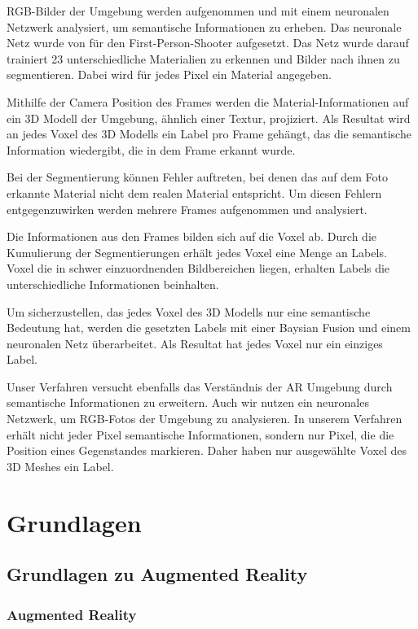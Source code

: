 RGB-Bilder der Umgebung werden aufgenommen und mit einem neuronalen Netzwerk analysiert, um semantische Informationen zu erheben. Das neuronale Netz wurde von \cite{contextawaremixedreality} für den First-Person-Shooter aufgesetzt. Das Netz wurde darauf trainiert 23 unterschiedliche Materialien zu erkennen und Bilder nach ihnen zu segmentieren. Dabei wird für jedes Pixel ein Material angegeben.

Mithilfe der Camera Position des Frames werden die Material-Informationen auf ein 3D Modell der Umgebung, ähnlich einer Textur, projiziert. Als Resultat wird an jedes Voxel des 3D Modells ein Label pro Frame gehängt, das die semantische Information wiedergibt, die in dem Frame erkannt wurde.

Bei der Segmentierung können Fehler auftreten, bei denen das auf dem Foto erkannte Material nicht dem realen Material entspricht. Um diesen Fehlern entgegenzuwirken werden mehrere Frames aufgenommen und analysiert. %

Die Informationen aus den Frames bilden sich auf die Voxel ab. Durch die Kumulierung der Segmentierungen erhält jedes Voxel eine Menge an Labels. Voxel die in schwer einzuordnenden Bildbereichen liegen, erhalten Labels die unterschiedliche Informationen beinhalten.

Um sicherzustellen, das jedes Voxel des 3D Modells nur eine semantische Bedeutung hat, werden die gesetzten Labels mit einer Baysian Fusion und einem neuronalen Netz überarbeitet. Als Resultat hat jedes Voxel nur ein einziges Label.

Unser Verfahren versucht ebenfalls das Verständnis der AR Umgebung durch semantische Informationen zu erweitern. Auch wir nutzen ein neuronales Netzwerk, um RGB-Fotos der Umgebung zu analysieren.
In unserem Verfahren erhält nicht jeder Pixel semantische Informationen, sondern nur Pixel, die die Position eines Gegenstandes markieren. Daher haben nur ausgewählte Voxel des 3D Meshes ein Label.\citep{contextawaremixedreality}

\newpage
\section{Grundlagen}
\subsection{Grundlagen zu Augmented Reality}
\subsubsection{Augmented Reality} %

